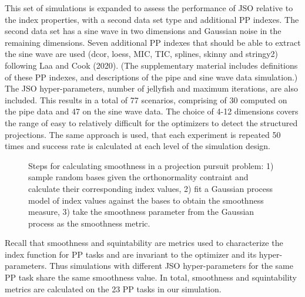\documentclass[
  12pt,
]{interact}
\theoremstyle{plain}
\begin{document}
This set of simulations is expanded to assess the performance of JSO
relative to the index properties, with a second data set type and
additional PP indexes. The second data set has a sine wave in two
dimensions and Gaussian noise in the remaining dimensions. Seven
additional PP indexes that should be able to extract the sine wave are
used (dcor, loess, MIC, TIC, splines, skinny and stringy2) following Laa
and Cook (2020). (The supplementary material includes definitions of
these PP indexes, and descriptions of the pipe and sine wave data
simulation.) The JSO hyper-parameters, number of jellyfish and maximum
iterations, are also included. This results in a total of 77 scenarios,
comprising of 30 computed on the pipe data and 47 on the sine wave data.
The choice of 4-12 dimensions covers the range of easy to relatively
difficult for the optimizers to detect the structured projections. The
same approach is used, that each experiment is repeated 50 times and
success rate is calculated at each level of the simulation design.

\begin{figure}


\caption{\label{fig-smoothness}Steps for calculating smoothness in a
projection pursuit problem: 1) sample random bases given the
orthonormality contraint and calculate their corresponding index values,
2) fit a Gaussian process model of index values against the bases to
obtain the smoothness measure, 3) take the smoothness parameter from the
Gaussian process as the smoothness metric.}

\end{figure}%

Recall that smoothness and squintability are metrics used to
characterize the index function for PP tasks and are invariant to the
optimizer and its hyper-parameters. Thus simulations with different JSO
hyper-parameters for the same PP task share the same smoothness value.
In total, smoothness and squintability metrics are calculated on the 23
PP tasks in our simulation.
\end{document}
